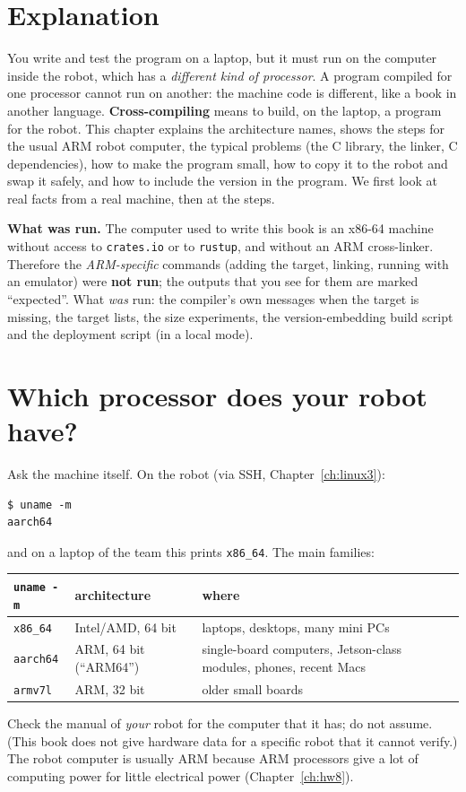 \label{ch:rust10}

\section*{Explanation}
You write and test the program on a laptop, but it must run on the computer inside the robot, which has a \emph{different kind of processor}. A program compiled for one processor cannot run on another: the machine code is different, like a book in another language. \textbf{Cross-compiling} means to build, on the laptop, a program for the robot. This chapter explains the architecture names, shows the steps for the usual ARM robot computer, the typical problems (the C library, the linker, C dependencies), how to make the program small, how to copy it to the robot and swap it safely, and how to include the version in the program. We first look at real facts from a real machine, then at the steps.

\textbf{What was run.} The computer used to write this book is an x86-64 machine without access to \verb!crates.io! or to \verb!rustup!, and without an ARM cross-linker. Therefore the \emph{ARM-specific} commands (adding the target, linking, running with an emulator) were \textbf{not run}; the outputs that you see for them are marked ``expected''. What \emph{was} run: the compiler's own messages when the target is missing, the target lists, the size experiments, the version-embedding build script and the deployment script (in a local mode).

\section*{Which processor does your robot have?}
Ask the machine itself. On the robot (via SSH, Chapter~\ref{ch:linux3}):
\begin{verbatim}
$ uname -m
aarch64
\end{verbatim}
and on a laptop of the team this prints \verb!x86_64!. The main families:
\begin{center}
\renewcommand{\arraystretch}{1.2}
\begin{tabular}{lp{3.6cm}p{7cm}}
\textbf{\texttt{uname -m}} & \textbf{architecture} & \textbf{where}\\ \hline
\verb!x86_64! & Intel/AMD, 64 bit & laptops, desktops, many mini PCs\\
\verb!aarch64! & ARM, 64 bit (``ARM64'') & single-board computers, Jetson-class modules, phones, recent Macs\\
\verb!armv7l! & ARM, 32 bit & older small boards\\
\end{tabular}
\end{center}
Check the manual of \emph{your} robot for the computer that it has; do not assume. (This book does not give hardware data for a specific robot that it cannot verify.) The robot computer is usually ARM because ARM processors give a lot of computing power for little electrical power (Chapter~\ref{ch:hw8}).

